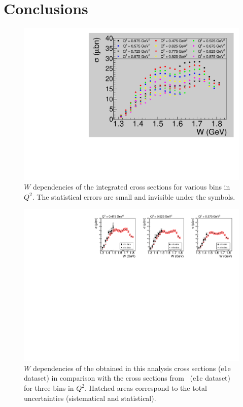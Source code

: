 \chapter{Conclusions}

\begin{figure}[htp]
\begin{center}
\includegraphics[width=12cm]{pictures/sys_err/all_q2.pdf}
\caption{\small $W$ dependencies of the integrated cross sections for various bins in $Q^{2}$. The statistical errors are small and invisible under the symbols.}
\label{fig:all_q2}
\end{center}
\end{figure}


\begin{figure}[htp]
\begin{center}
\includegraphics[width=12cm]{pictures/conclusions/e1e_e1c.pdf}
\caption{\small $W$ dependencies of the obtained in this analysis  cross sections (e1e dataset) in comparison with the cross sections from~\cite{Fedotov:2008aa} (e1c dataset) for three bins in $Q^{2}$. Hatched areas correspond to the total uncertainties (sistematical and statistical).}
\label{fig:e1e_e1c}
\end{center}
\end{figure}


